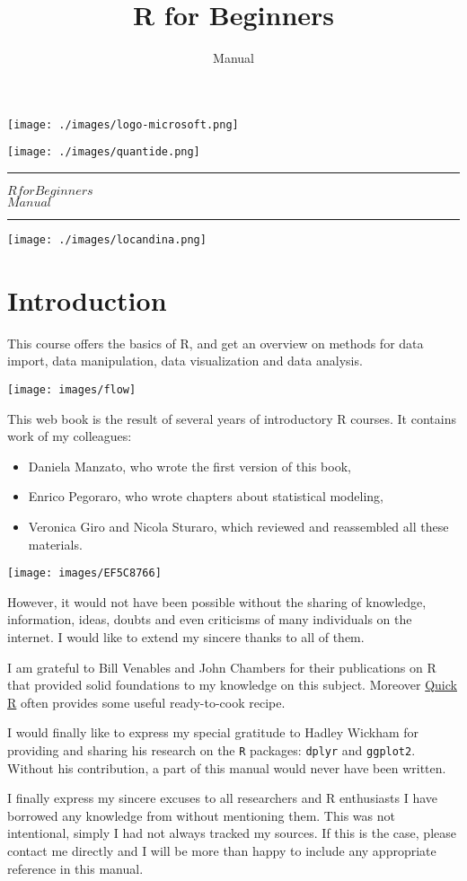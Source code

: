 \documentclass[]{book}
\title{R for Beginners}
\subtitle{Manual}
\author{}
\date{}
\providecommand{\tightlist}{%
  \setlength{\itemsep}{0pt}\setlength{\parskip}{0pt}}
\def\tightlist{}
\def\maketitle{%
  \null
  \thispagestyle{empty}%
   \begin{flushleft}\texttt{[image: ./images/logo-microsoft.png]}\end{flushleft}
  \vspace{-2cm}
  \begin{flushright}\texttt{[image: ./images/quantide.png]}\end{flushright}
  \vskip 5cm
  \hrule height 2pt
  \begin{center} \par \huge \strut \textbf{$R for Beginners$}\\ $Manual$ \par  \end{center}
  \vspace{0.5cm}
  \hrule height 2pt
  \vspace{0.5cm}
  \texttt{[image: ./images/locandina.png]}
  \clearpage
}
\begin{document}
\maketitle

{
\setcounter{tocdepth}{1}
\tableofcontents
}
\chapter{Introduction}\label{introduction}

This course offers the basics of R, and get an overview on methods for
data import, data manipulation, data visualization and data analysis.

\texttt{[image: images/flow]}

This web book is the result of several years of introductory R courses.
It contains work of my colleagues:

\begin{itemize}
\tightlist
\item
  Daniela Manzato, who wrote the first version of this book,
\item
  Enrico Pegoraro, who wrote chapters about statistical modeling,
\item
  Veronica Giro and Nicola Sturaro, which reviewed and reassembled all
  these materials.
\end{itemize}

\texttt{[image: images/EF5C8766]}

However, it would not have been possible without the sharing of
knowledge, information, ideas, doubts and even criticisms of many
individuals on the internet. I would like to extend my sincere thanks to
all of them.

I am grateful to Bill Venables and John Chambers for their publications
on R that provided solid foundations to my knowledge on this subject.
Moreover \href{http://www.statmethods.net/}{Quick R} often provides some
useful ready-to-cook recipe.

I would finally like to express my special gratitude to Hadley Wickham
for providing and sharing his research on the \texttt{R} packages:
\texttt{dplyr} and \texttt{ggplot2}. Without his contribution, a part of
this manual would never have been written.

I finally express my sincere excuses to all researchers and R
enthusiasts I have borrowed any knowledge from without mentioning them.
This was not intentional, simply I had not always tracked my sources. If
this is the case, please contact me directly and I will be more than
happy to include any appropriate reference in this manual.
\end{document}
